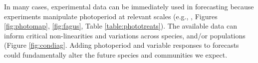\documentclass{article}
\begin{document}
\par In many cases, experimental data can be immediately used in forecasting because experiments manipulate photoperiod at relevant scales (e.g., \citet{Basler:2014aa,Heide:2015aa}, Figures \ref{fig:photomap}, \ref{fig:fagus}, Table \ref{table:phototreats}).  The available data can inform critical  non-linearities and variations across species, and/or populations (Figure \ref{fig:condiag}.  Adding photoperiod and variable responses to forecasts could fundamentally alter the future species and communities we expect. 
\end{document}
